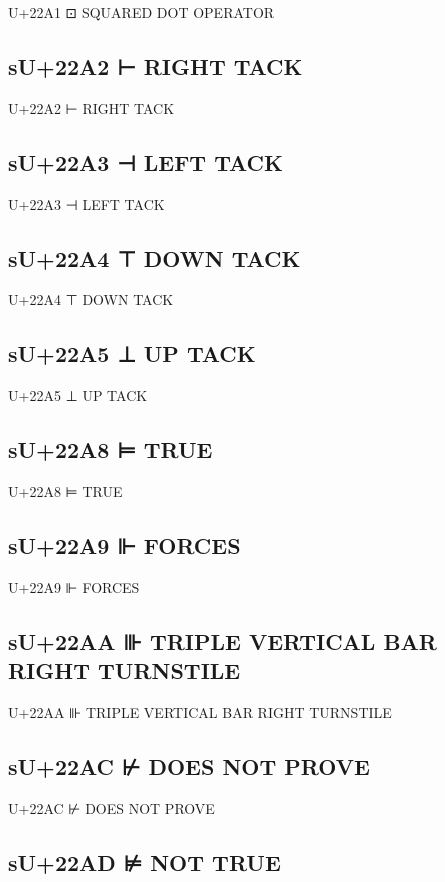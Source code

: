 U+22A1 ⊡ SQUARED DOT OPERATOR

\subsection{sU+22A2 ⊢ RIGHT TACK}

U+22A2 ⊢ RIGHT TACK

\subsection{sU+22A3 ⊣ LEFT TACK}

U+22A3 ⊣ LEFT TACK

\subsection{sU+22A4 ⊤ DOWN TACK}

U+22A4 ⊤ DOWN TACK

\subsection{sU+22A5 ⊥ UP TACK}

U+22A5 ⊥ UP TACK

\subsection{sU+22A8 ⊨ TRUE}

U+22A8 ⊨ TRUE

\subsection{sU+22A9 ⊩ FORCES}

U+22A9 ⊩ FORCES

\subsection{sU+22AA ⊪ TRIPLE VERTICAL BAR RIGHT TURNSTILE}

U+22AA ⊪ TRIPLE VERTICAL BAR RIGHT TURNSTILE

\subsection{sU+22AC ⊬ DOES NOT PROVE}

U+22AC ⊬ DOES NOT PROVE

\subsection{sU+22AD ⊭ NOT TRUE}


